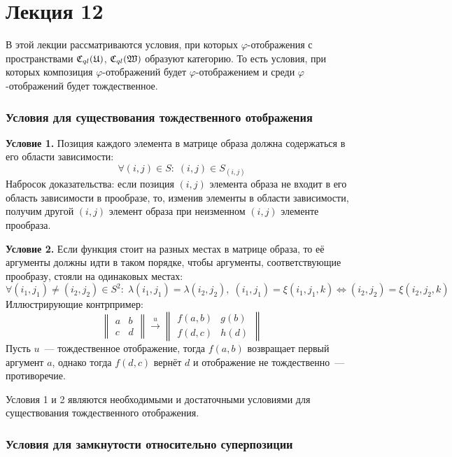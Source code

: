 \documentclass[a4paper, 12pt]{report}
\begin{document}
\chapter{Лекция 12}

В этой лекции рассматриваются условия, при которых $\varphi$-отображения с пространствами $\mathfrak{C}_{ql}(\mathfrak{U})$, $\mathfrak{C}_{ql}(\mathfrak{W})$ образуют категорию. То есть условия, при которых композиция $\varphi$-отображений будет $\varphi$-отображением и среди $\varphi$-отображений будет тождественное.

\subsection{Условия для существования тождественного отображения}

\textbf{Условие 1.} Позиция каждого элемента в матрице образа должна содержаться в его области зависимости:
\[
\forall (i, j) \in S: \; (i, j) \in S_{(i,j)}
\] 
Набросок доказательства: если позиция $(i,j)$ элемента образа не входит в его область зависимости в прообразе, то, изменив элементы в области зависимости, получим другой $(i,j)$ элемент образа при неизменном $(i,j)$ элементе прообраза. 

\textbf{Условие 2.} Если функция стоит на разных местах в матрице образа, то её аргументы должны идти в таком порядке, чтобы аргументы, соответствующие прообразу, стояли на одинаковых местах:
\[
\forall (i_1, j_1) \neq (i_2, j_2) \in S^2: \; \lambda(i_1, j_1) = \lambda(i_2, j_2), \; (i_1, j_1) = \xi(i_1, j_1, k) \Leftrightarrow (i_2, j_2) = \xi(i_2, j_2, k)
\]
Иллюстрирующие контрпример:\\
\[
\begin{Vmatrix}
a & b\\
c & d
\end{Vmatrix}
\mathop{\rightarrow}\limits^u
\begin{Vmatrix}
f(a,b) & g(b)\\
f(d,c) & h(d)
\end{Vmatrix}
\]
Пусть $u$~--- тождественное отображение, тогда $f(a,b)$ возвращает первый аргумент $a$, однако тогда $f(d,c)$ вернёт $d$ и отображение не тождественно~--- противоречие.

Условия 1 и 2 являются необходимыми и достаточными условиями для существования тождественного отображения.

\subsection{Условия для замкнутости относительно суперпозиции}
\end{document}
